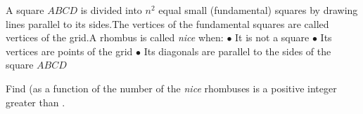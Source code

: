 A square $ABCD$ is divided into $n^2$ equal small (fundamental) squares by drawing lines parallel to its sides.The vertices of the fundamental squares are called vertices of the grid.A rhombus is called \textit{nice} when:
$\bullet$ It is not a square
$\bullet$ Its vertices are points of the grid
$\bullet$ Its diagonals are parallel to the sides of the square $ABCD$

Find (as a function of  the number of the \textit{nice} rhombuses  is a positive integer greater than .